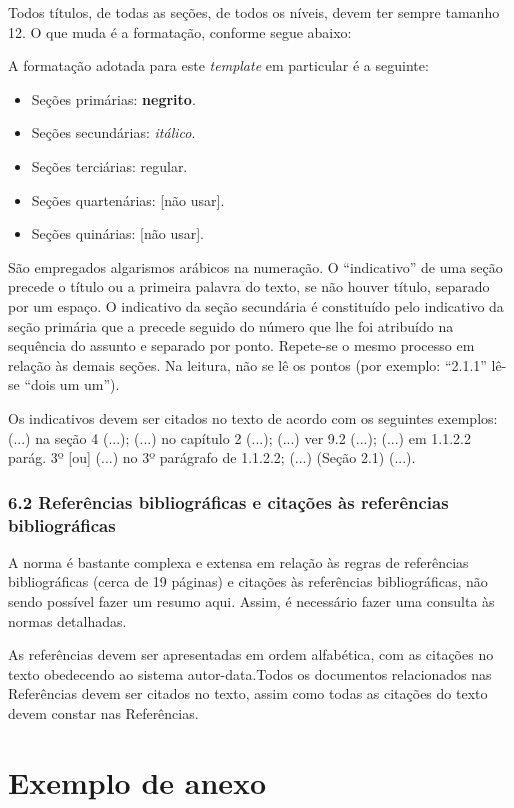\documentclass[
	12pt,				%
	oneside,			%
	a4paper,			%
	english,			%
	brazil				%
	]{abntex2ppgsi}
\begin{document}
\begin{anexosenv}
Todos títulos, de todas as seções, de todos os níveis, devem ter sempre tamanho 12. O que muda é a formatação, conforme segue abaixo:

A formatação adotada para este \textit{template} em particular é a seguinte:

\begin{itemize}
	\item Seções primárias: \textbf{negrito}.
	\item Seções secundárias: \textit{itálico}.
	\item Seções terciárias: regular.
	\item Seções quartenárias: [não usar].
	\item Seções quinárias: [não usar].
\end{itemize}

São empregados algarismos arábicos na numeração. O ``indicativo'' de uma seção precede o título ou a primeira palavra do texto, se não houver título, separado por um espaço. O indicativo da seção secundária é constituído pelo indicativo da seção primária que a precede seguido do número que lhe foi atribuído na sequência do assunto e separado por ponto. Repete-se o mesmo processo em relação às demais seções. Na leitura, não se lê os pontos (por exemplo: ``2.1.1'' lê-se ``dois um um'').

Os indicativos devem ser citados no texto de acordo com os seguintes exemplos: (...) na seção 4 (...); (...) no capítulo 2 (...); (...) ver 9.2 (...); (...) em 1.1.2.2 parág. 3º [ou] (...) no 3º parágrafo de 1.1.2.2; (...) (Seção 2.1) (...).

\subsection*{6.2 Referências bibliográficas e citações às referências bibliográficas}

A norma é bastante complexa e extensa em relação às regras de referências bibliográficas (cerca de 19 páginas) e citações às referências bibliográficas, não sendo possível fazer um resumo aqui. Assim, é necessário fazer uma consulta às normas detalhadas.

As referências devem ser apresentadas em ordem alfabética, com as citações no texto obedecendo ao sistema autor-data.Todos os documentos relacionados nas Referências devem ser citados no texto, assim como todas as citações do texto devem constar nas Referências.

\chapter{Exemplo de anexo}


\end{anexosenv}
\end{document}
